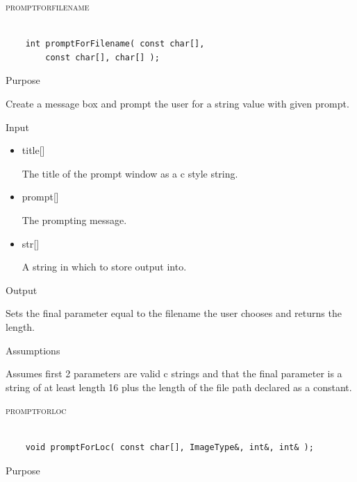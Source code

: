 \documentclass[pdftex, 11pt]{article}
\begin{document}
\begin{description}
	\item{\textsc{promptforfilename}}

		\begin{lstlisting}

	int promptForFilename( const char[], 
		const char[], char[] );
		\end{lstlisting}

		\begin{description}
			\item{Purpose}

				Create a message box and prompt the user for a string value with given prompt.

			\item{Input}

				\begin{itemize}

					\item{title[]}

						The title of the prompt window as a c style string.

					\item{prompt[]}

						The prompting message.

					\item{str[]}

						A string in which to store output into.

				\end{itemize}

			\item{Output}

				Sets the final parameter equal to the filename the user
				chooses and returns the length.

			\item{Assumptions}

				Assumes first 2 parameters are valid c strings and that
				the final parameter is a string of at least length 16 plus
				the length of the file path declared as a constant.

		\end{description}



	\item{\textsc{promptforloc}}

		\begin{lstlisting}

	void promptForLoc( const char[], ImageType&, int&, int& );
		\end{lstlisting}

		\begin{description}
			\item{Purpose}


\end{description}
\end{description}
\end{document}
